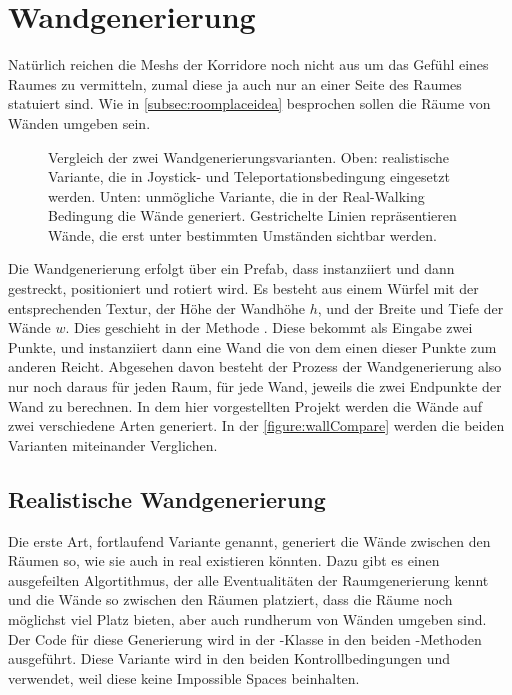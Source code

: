 \begin{figure}[H] %
    \centering
    \caption{} %
    \label{figure:uvcode}
\end{figure}



\section{Wandgenerierung}
\label{sec:genwalls}
Natürlich reichen die Meshs der Korridore noch nicht aus um das Gefühl eines Raumes zu vermitteln, zumal diese ja auch nur an einer Seite des Raumes statuiert sind.
Wie in \autoref{subsec:roomplaceidea} besprochen sollen die Räume von Wänden umgeben sein.

\begin{figure}[H]
    \centering

    \scalebox{0.4}{}
    \caption{Vergleich der zwei Wandgenerierungsvarianten. Oben: realistische Variante, die in Joystick- und Teleportationsbedingung eingesetzt werden. Unten: unmögliche Variante, die in der Real-Walking Bedingung die Wände generiert. Gestrichelte Linien repräsentieren Wände, die erst unter bestimmten Umständen sichtbar werden.}
    \label{figure:wallCompare}
\end{figure}

Die Wandgenerierung erfolgt über ein Prefab, dass instanziiert und dann gestreckt, positioniert und rotiert wird. Es besteht aus einem Würfel mit der entsprechenden Textur, %
der Höhe der Wandhöhe $h$, und der Breite und Tiefe der Wände $w$. Dies geschieht in der Methode . Diese bekommt als Eingabe zwei Punkte, und instanziiert dann eine Wand die von dem einen dieser Punkte zum anderen Reicht. %
Abgesehen davon besteht der Prozess der Wandgenerierung also nur noch daraus für jeden Raum, für jede Wand, jeweils die zwei Endpunkte der Wand zu berechnen.
In dem hier vorgestellten Projekt werden die Wände auf zwei verschiedene Arten generiert. In der \autoref{figure:wallCompare} werden die beiden Varianten miteinander Verglichen.

\subsection{Realistische Wandgenerierung}\label{subsec:realwallgen}
Die erste Art, fortlaufend  Variante genannt, generiert die Wände zwischen den Räumen so, wie sie auch in real existieren könnten.
Dazu gibt es einen ausgefeilten Algortithmus, der alle Eventualitäten der Raumgenerierung kennt und die Wände so zwischen den Räumen platziert, dass die Räume noch möglichst viel Platz bieten, aber auch rundherum von Wänden umgeben sind. Der Code für diese Generierung wird in der -Klasse in den beiden -Methoden ausgeführt. Diese Variante wird in den beiden Kontrollbedingungen  und  verwendet, weil diese keine Impossible Spaces beinhalten.


